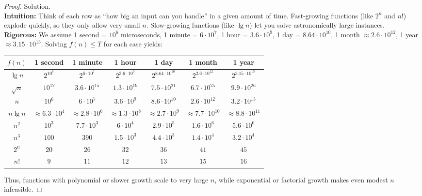 \documentclass[12pt]{article}
\theoremstyle{definition}
\begin{document}
\begin{proof}
Solution.\\

\noindent
\textbf{Intuition:} Think of each row as “how big an input can you handle” in a given amount of time.  
Fast-growing functions (like $2^n$ and $n!$) explode quickly, so they only allow very small $n$.  
Slow-growing functions (like $\lg n$) let you solve astronomically large instances.\\

\noindent
\textbf{Rigorous:} We assume 1 second = $10^6$ microseconds, 1 minute = $6\cdot 10^7$,  
1 hour = $3.6\cdot 10^9$, 1 day = $8.64\cdot 10^{10}$, 1 month $\approx 2.6\cdot 10^{12}$,  
1 year $\approx 3.15\cdot 10^{13}$. Solving $f(n) \leq T$ for each case yields:  

\begin{center}
\begin{tabular}{|c|c|c|c|c|c|c|}
\hline
$f(n)$ & 1 second & 1 minute & 1 hour & 1 day & 1 month & 1 year \\
\hline
$\lg n$   & $2^{10^6}$ & $2^{6\cdot 10^7}$ & $2^{3.6\cdot 10^9}$ & $2^{8.64\cdot 10^{10}}$ & $2^{2.6\cdot 10^{12}}$ & $2^{3.15\cdot 10^{13}}$ \\
\hline
$\sqrt{n}$ & $10^{12}$ & $3.6\cdot 10^{15}$ & $1.3\cdot 10^{19}$ & $7.5\cdot 10^{21}$ & $6.7\cdot 10^{25}$ & $9.9\cdot 10^{26}$ \\
\hline
$n$       & $10^6$ & $6\cdot 10^7$ & $3.6\cdot 10^9$ & $8.6\cdot 10^{10}$ & $2.6\cdot 10^{12}$ & $3.2\cdot 10^{13}$ \\
\hline
$n \lg n$ & $\approx 6.3\cdot 10^4$ & $\approx 2.8\cdot 10^6$ & $\approx 1.3\cdot 10^8$ & $\approx 2.7\cdot 10^9$ & $\approx 7.7\cdot 10^{10}$ & $\approx 8.8\cdot 10^{11}$ \\
\hline
$n^2$     & $10^3$ & $7.7\cdot 10^3$ & $6\cdot 10^4$ & $2.9\cdot 10^5$ & $1.6\cdot 10^6$ & $5.6\cdot 10^6$ \\
\hline
$n^3$     & $100$ & $390$ & $1.5\cdot 10^3$ & $4.4\cdot 10^3$ & $1.4\cdot 10^4$ & $3.2\cdot 10^4$ \\
\hline
$2^n$     & $20$ & $26$ & $32$ & $36$ & $41$ & $45$ \\
\hline
$n!$      & $9$ & $11$ & $12$ & $13$ & $15$ & $16$ \\
\hline
\end{tabular}
\end{center}

\noindent
Thus, functions with polynomial or slower growth scale to very large $n$, while exponential or factorial growth makes even modest $n$ infeasible.
\end{proof}
\end{document}
